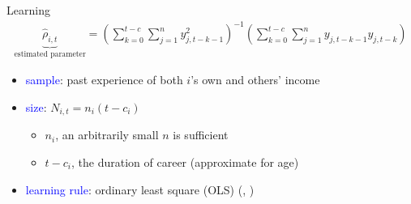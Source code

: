 \documentclass{beamer}
\begin{document}
\begin{frame}{Learning}
	\begin{eqnarray}
		\underbrace{\hat \rho_{i,t}}_{\text{estimated parameter}}= (\sum^{t-c}_{k=0}\sum^{n}_{j=1}y^2_{j,t-k-1})^{-1}(\sum^{t-c}_{k=0}\sum^{n}_{j=1}y_{j,t-k-1}y_{j,t-k})
	\end{eqnarray}
	
	\begin{itemize}
		\item \textcolor{blue}{sample}: past experience of both $i$'s own and others' income
		\item \textcolor{blue}{size}:   $N_{i,t} = n_i (t-c_i )$
		\begin{itemize}
			\item $n_i$, an arbitrarily small $n$ is sufficient
			\item $t-c_i$, the duration of career (approximate for age)   
		\end{itemize}
		\item \textcolor{blue}{learning rule}: ordinary least square (OLS) (\cite{evans2012learning}, \cite{malmendier2015learning})
	\end{itemize} 
\end{frame}
\end{document}
